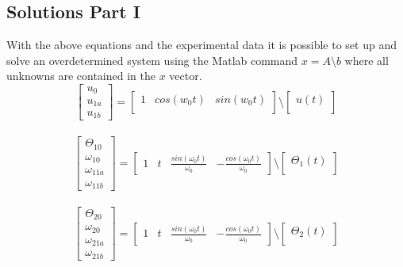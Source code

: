 \documentclass[11pt,titlepage]{article}
\begin{document}
	\subsection{Solutions Part I}
		With the above equations and the experimental data it is possible to set up and solve an overdetermined system using the Matlab command $x =A \setminus b$ where all unknowns are contained in the $x$ vector.
		\begin{equation}
			\begin{bmatrix}
				u_0 \\
				u_{1a} \\
				u_{1b}
			\end{bmatrix}
			=
			\begin{bmatrix}
				1 & cos(w_0t) & sin(w_0t) \\
			\end{bmatrix}
			\setminus
			\begin{bmatrix}
				u(t) \\
			\end{bmatrix}
		\end{equation} \\
		\begin{equation}
			\begin{bmatrix}
				\Theta_{10} \\
				\omega_{10} \\
				\omega_{11a} \\
				\omega_{11b}
			\end{bmatrix}
			=
			\begin{bmatrix}
				1 & t & \frac{sin(\omega_0t)}{\omega_0} & -\frac{cos(\omega_0t)}{\omega_0}
			\end{bmatrix}
			\setminus
			\begin{bmatrix}
				\Theta_1(t) \\
			\end{bmatrix}
		\end{equation} \\
		\begin{equation}
			\begin{bmatrix}
				\Theta_{20} \\
				\omega_{20} \\
				\omega_{21a} \\
				\omega_{21b}
			\end{bmatrix}
			=
			\begin{bmatrix}
				1 & t & \frac{sin(\omega_0t)}{\omega_0} & -\frac{cos(\omega_0t)}{\omega_0}
			\end{bmatrix}
			\setminus
			\begin{bmatrix}
				\Theta_2(t) \\
			\end{bmatrix}
		\end{equation}
\end{document}
